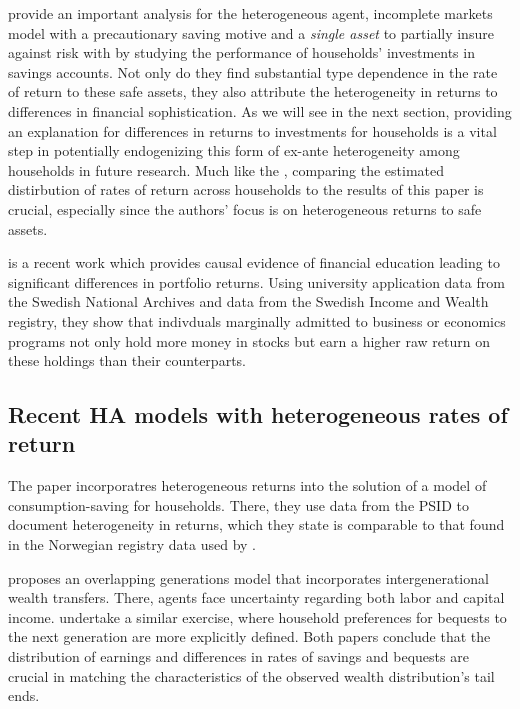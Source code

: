 \par \cite{Deuflhard2018} provide an important analysis for the heterogeneous agent, incomplete markets model with a precautionary saving motive and a \textit{single asset} to partially insure against risk with by studying the performance of households' investments in savings accounts. Not only do they find substantial type dependence in the rate of return to these safe assets, they also attribute the heterogeneity in returns to differences in financial sophistication. As we will see in the next section, providing an explanation for differences in returns to investments for households is a vital step in potentially endogenizing this form of ex-ante heterogeneity among households in future research. Much like the \cite{aflgdmlp20}, comparing the estimated distirbution of rates of return across households to the results of this paper is crucial, especially since the authors' focus is on heterogeneous returns to  safe assets.

\par \cite{altmejd2024} is a recent work which provides causal evidence of financial education leading to significant differences in portfolio returns. Using university application data from the Swedish National Archives and data from the Swedish Income and Wealth registry, they show that indivduals marginally admitted to business or economics programs not only hold more money in stocks but earn a higher raw return on these holdings than their counterparts.


\subsection{Recent HA models with heterogeneous rates of return}

\par The paper \cite{Daminato2024} incorporatres heterogeneous returns into the solution of a model of consumption-saving for households. There, they use data from the PSID to document heterogeneity in returns, which they state is comparable to that found in the Norwegian registry data used by \cite{aflgdmlp20}.

\par \cite{Benhabib2019} proposes an overlapping generations model that incorporates intergenerational wealth transfers. There, agents face uncertainty regarding both labor and capital income. \cite{jbabml17} undertake a similar exercise, where household preferences for bequests to the next generation are more explicitly defined. Both papers conclude that the distribution of earnings and differences in rates of savings and bequests are crucial in matching the characteristics of the observed wealth distribution's tail ends.

